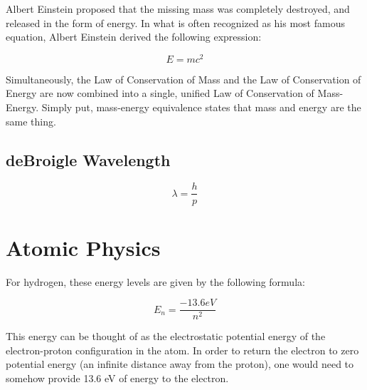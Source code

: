 Albert Einstein proposed that the missing mass was completely destroyed, and released in the form of energy.  In what is often recognized as his most famous equation, Albert Einstein derived the following expression:

\begin{mdframed}[backgroundcolor=orange!20!white]
	\begin{equation}
		E = mc^2
		\label{eqn:energymass}
	\end{equation}
\end{mdframed}

Simultaneously, the Law of Conservation of Mass and the Law of Conservation of Energy are now combined into a single, unified Law of Conservation of Mass-Energy.  Simply put, mass-energy equivalence states that mass and energy are the same thing. 






\subsection{deBroigle Wavelength} 

\begin{mdframed}[backgroundcolor=orange!20!white]
	\begin{equation}
		\lambda = \frac{h}{p}
		\label{eqn:debroigle}
	\end{equation}
\end{mdframed}


\section{Atomic Physics} 


For hydrogen, these energy levels are given by the following formula:

\begin{mdframed}[backgroundcolor=orange!20!white]
	\begin{equation}
	E_n = \frac{-13.6 \si{eV}}{n^2}  
	\label{eqn:hydrogenenergy}
	\end{equation}
\end{mdframed}

This energy can be thought of as the electrostatic potential energy of the electron-proton configuration in the atom.  In order to return the electron to zero potential energy (an infinite distance away from the proton), one would need to somehow provide 13.6 eV of energy to the electron.  


